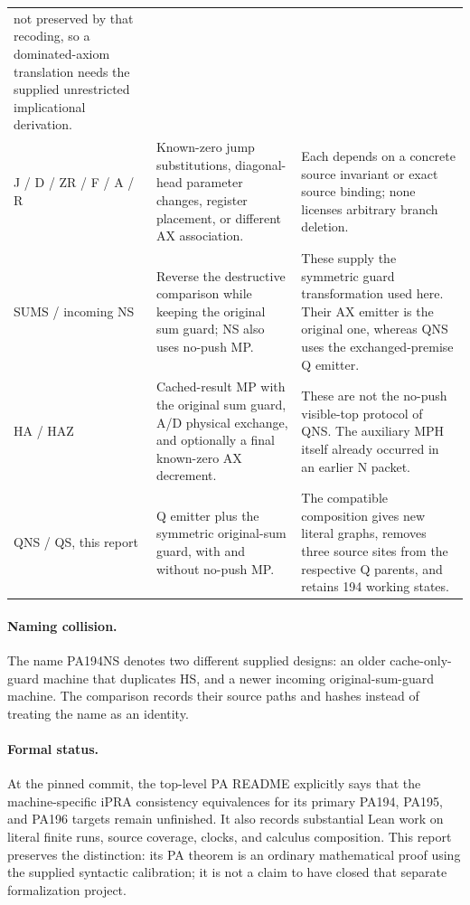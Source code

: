\documentclass[11pt,letterpaper]{article}
\begin{document}
\begin{longtable}{>{\raggedright\arraybackslash}p{.18\linewidth}
                  >{\raggedright\arraybackslash}p{.34\linewidth}
                  >{\raggedright\arraybackslash}p{.40\linewidth}}
not preserved by that recoding, so a dominated-axiom translation needs
the supplied unrestricted implicational derivation.\\
J / D / ZR / F / A / R & Known-zero jump substitutions, diagonal-head
parameter changes, register placement, or different AX association. &
Each depends on a concrete source invariant or exact source binding;
none licenses arbitrary branch deletion.\\
SUMS / incoming NS & Reverse the destructive comparison while keeping
the original sum guard; NS also uses no-push MP. & These supply the
symmetric guard transformation used here. Their AX emitter is the
original one, whereas QNS uses the exchanged-premise Q emitter.\\
HA / HAZ & Cached-result MP with the original sum guard, A/D physical
exchange, and optionally a final known-zero AX decrement. & These are
not the no-push visible-top protocol of QNS. The auxiliary MPH itself
already occurred in an earlier N packet.\\
QNS / QS, this report & Q emitter plus the symmetric original-sum guard,
with and without no-push MP. & The compatible composition gives new
literal graphs, removes three source sites from the respective Q
parents, and retains 194 working states.\\
\bottomrule
\end{longtable}
\normalsize

\paragraph{Naming collision.}
The name PA194NS denotes two different supplied designs: an older
cache-only-guard machine that duplicates HS, and a newer incoming
original-sum-guard machine. The comparison records their source paths and
hashes instead of treating the name as an identity.

\paragraph{Formal status.}
At the pinned commit, the top-level PA README explicitly says that the
machine-specific iPRA consistency equivalences for its primary PA194,
PA195, and PA196 targets remain unfinished. It also records substantial
Lean work on literal finite runs, source coverage, clocks, and calculus
composition. This report preserves the distinction: its PA theorem is an
ordinary mathematical proof using the supplied syntactic calibration;
it is not a claim to have closed that separate formalization project.
\end{document}

